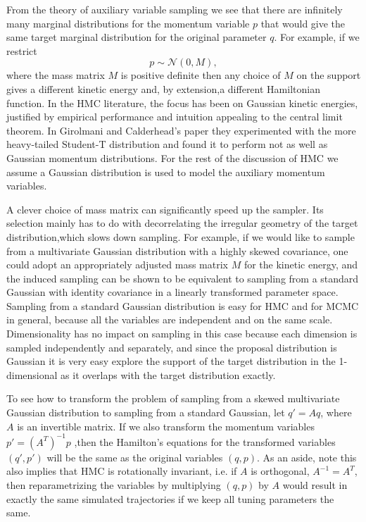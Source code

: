 \documentclass[12pt]{report}
\begin{document}
From the theory of auxiliary variable sampling we see that there are infinitely
many marginal distributions for the momentum variable $p$ that would give the
same target marginal distribution for the original parameter $q$. For example,
if we restrict 
\[ p \sim \mathcal{N}(0,M), \]
where the mass matrix $M$ is positive definite then any choice of $M$ on the support gives a
different kinetic energy and, by extension,a different Hamiltonian function. In the HMC
literature, the focus has been on Gaussian kinetic energies, 
justified by empirical performance and intuition appealing to the central limit
theorem. In Girolmani and Calderhead's paper \cite{girolami2011riemann} they experimented
with the more heavy-tailed Student-T distribution and found it to perform not as
well
as Gaussian momentum distributions. For the rest of the discussion of HMC we
assume a Gaussian distribution is used to model the auxiliary momentum variables.

A clever choice of mass matrix can significantly speed up the sampler. Its
selection mainly has to do with decorrelating the irregular geometry of the
target distribution,which slows down sampling. For example, if we would like to sample from a multivariate
Gaussian distribution with a highly skewed covariance, one could adopt an
appropriately adjusted mass
matrix $M$ for the kinetic energy, and the induced sampling can be shown to be
equivalent to sampling from a standard Gaussian with identity covariance in a
linearly transformed parameter space. Sampling from a standard Gaussian
distribution is easy
for HMC and for MCMC in general, because all the variables are independent and on
the same scale. Dimensionality has no impact on sampling in this case because
each dimension is sampled independently and separately, and since the proposal
distribution is Gaussian it is very easy explore the support of the target
distribution in the 1-dimensional as it overlaps with the target distribution
exactly. 

To see how to transform the problem of sampling from a skewed multivariate
Gaussian distribution to sampling from a standard Gaussian, let $q' = Aq$, where $A$ is an invertible matrix. If we also
transform the momentum variables $p' = (A^T)^{-1}p$ ,then the
Hamilton's equations for the transformed variables $(q',p')$ will be the same as
the original variables $(q,p)$. As an aside, note this also implies that HMC is rotationally
invariant, i.e. if $A$ is orthogonal, $A^{-1} = A^T$, then reparametrizing the
variables by  multiplying $(q,p)$ by $A$ would result in exactly the same simulated
trajectories if we keep all tuning parameters the same.
\end{document}

